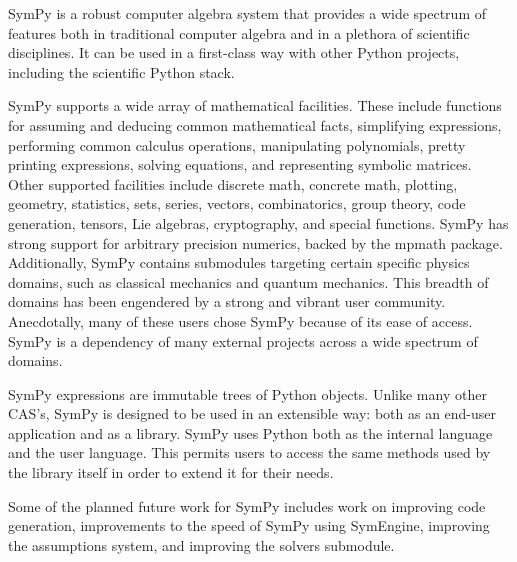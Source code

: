 SymPy is a robust computer algebra system that provides a wide spectrum of
features both in traditional computer algebra and in a plethora of scientific
disciplines. It can be used in a first-class way with other
Python projects, including the scientific Python stack.


SymPy supports a wide array of mathematical facilities. These include
functions for assuming and deducing common mathematical facts,
simplifying expressions, performing common calculus operations, manipulating polynomials, pretty printing
expressions, solving equations, and representing symbolic matrices. Other supported
facilities
include discrete math, concrete math, plotting, geometry, statistics,
sets, series, vectors, combinatorics, group theory, code
generation, tensors, Lie algebras, cryptography, and special functions.
SymPy has strong support for arbitrary precision numerics, backed by the
mpmath package. Additionally, SymPy contains submodules targeting certain specific physics domains,
such as classical mechanics and quantum mechanics.  This breadth of domains has
been engendered by a strong and vibrant user community.
Anecdotally, many of these users chose SymPy because of its ease of access.
SymPy is a dependency of many external projects across a wide
spectrum of domains.

SymPy expressions are immutable trees of Python objects. Unlike many other
CAS's, SymPy is designed to be used in an extensible way: both as an end-user
application and as a library. SymPy uses Python both as the internal language
and the user language. This permits users to access the same methods used
by the library itself in order to extend it for their needs.


Some of the planned future work for SymPy includes work on improving code
generation, improvements to the speed of SymPy using SymEngine, improving the
assumptions system, and improving the solvers submodule.


